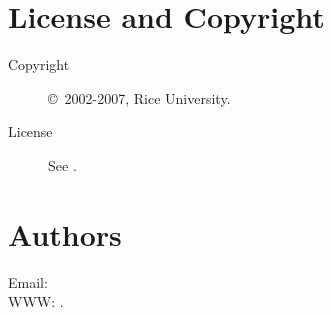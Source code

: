 \documentclass[english]{article}
\begin{document}
\section{License and Copyright}

\begin{description}
\item[Copyright] \copyright\ 2002-2007, Rice University.
\item[License] See .
\end{description}

\section{Authors}

Email:  \\
WWW: .

\LatexManEnd
\end{document}
